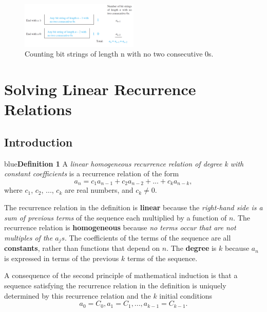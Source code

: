 \documentclass[11pt]{article}
\newenvironment{definition}[1]{\begin{mybox}{blue}{\textbf{Definition #1}}}{\end{mybox}}
\begin{document}
\begin{figure}[h]
    \centering
    \includegraphics[width=0.5\textwidth]{bit-string.png}
    \caption{Counting bit strings of length n with no two consecutive $0$s.}
    \label{fig:my_label}
\end{figure}


\section{Solving Linear Recurrence Relations}

\subsection{Introduction}

\begin{definition}
{1}
A \textit{linear homogeneous recurrence relation of degree k with constant coefficients} is a recurrence relation of the form
\begin{equation*}
a_n = c_1a_{n-1} + c_2a_{n-2} + ... + c_ka_{n-k},
\end{equation*}
where $c_1$, $c_2$, ..., $c_k$ are real numbers, and $c_k \neq 0$.
\end{definition}

The recurrence relation in the definition is \textbf{linear} because the \textit{right-hand side is a sum of previous terms} of the sequence each multiplied by a function of $n$. 
The recurrence relation is \textbf{homogeneous} because \textit{no terms occur that are not multiples of the $a_js$}. 
The coefficients of the terms of the sequence are all \textbf{constants}, rather than functions that depend on $n$. 
The \textbf{degree} is $k$ because $a_n$ is expressed in terms of the previous $k$ terms of the sequence.

A consequence of the second principle of mathematical induction is that a sequence satisfying the recurrence relation in the definition is uniquely determined by this recurrence relation and the $k$ initial conditions
\begin{equation*}
    a_0 = C_0, a_1 = C_1, ..., a_{k-1} = C_{k-1}.
\end{equation*}
\end{document}
